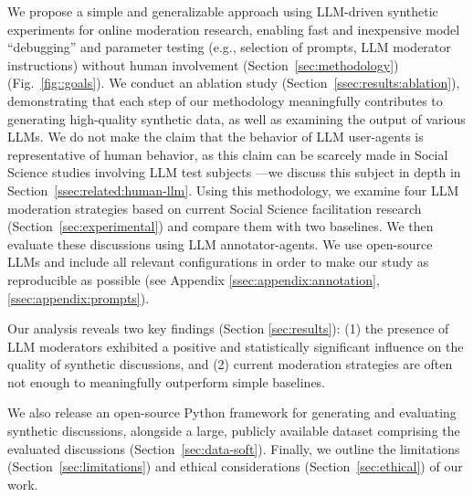We propose a simple and generalizable approach using \ac{LLM}-driven synthetic experiments for online moderation research, enabling fast and inexpensive model “debugging” and parameter testing (e.g., selection of prompts, \ac{LLM} moderator instructions) without human involvement (Section~\ref{sec:methodology}) (Fig.~\ref{fig::goals}). We conduct an ablation study (Section~\ref{ssec:results:ablation}), demonstrating that each step of our methodology meaningfully contributes to generating high-quality synthetic data, as well as examining the output of various \acp{LLM}. We do not make the claim that the behavior of \ac{LLM} user-agents is representative of human behavior, as this claim can be scarcely made in Social Science studies involving \ac{LLM} test subjects \cite{rossi_2024}—we discuss this subject in depth in Section~\ref{ssec:related:human-llm}. Using this methodology, we examine four \ac{LLM} moderation strategies based on current Social Science facilitation research (Section~\ref{sec:experimental})
and compare them with two baselines. We then evaluate these discussions using \ac{LLM} annotator-agents. We use open-source \acp{LLM} and include all relevant configurations in order to make our study as reproducible as possible (see Appendix \ref{ssec:appendix:annotation}, \ref{ssec:appendix:prompts}).


 Our analysis reveals two key findings (Section \ref{sec:results}): (1) the presence of \ac{LLM} moderators exhibited a positive and statistically significant influence on the quality of synthetic discussions, and (2) current moderation strategies are often not enough to meaningfully outperform simple baselines. %

We also release \syndisco an open-source Python framework for generating and evaluating synthetic discussions, alongside \vmd\datasetlink a large, publicly available dataset comprising the evaluated discussions (Section~\ref{sec:data-soft}). Finally, we outline the limitations (Section~\ref{sec:limitations}) and ethical considerations (Section~\ref{sec:ethical}) of our work.